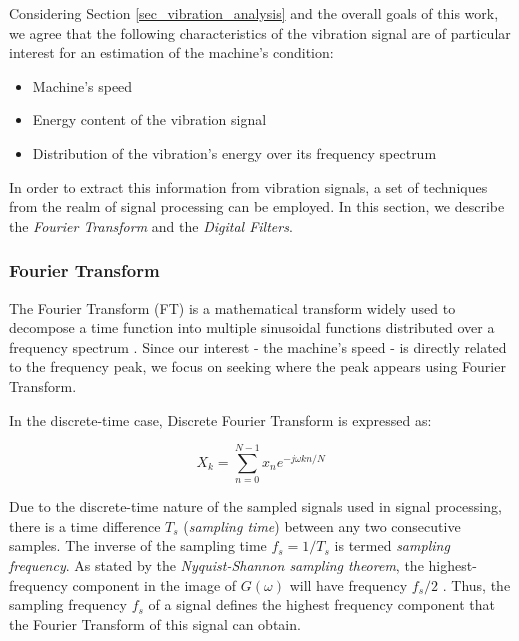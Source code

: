 \documentclass[conference]{IEEEtran}
\begin{document}
Considering Section \ref{sec_vibration_analysis} and the overall goals of this work, we agree that the following characteristics of the vibration signal are of particular interest for an estimation of the machine's condition:

\begin{itemize}
	\item Machine's speed
	\item Energy content of the vibration signal
	\item Distribution of the vibration's energy over its frequency spectrum
\end{itemize}


In order to extract this information from vibration signals, a set of techniques from the realm of signal processing can be employed. In this section, we describe the \textit{Fourier Transform} and the \textit{Digital Filters}.

\subsubsection{Fourier Transform}


The Fourier Transform (FT) is a mathematical transform widely used to decompose a time function into multiple sinusoidal functions distributed over a frequency spectrum \cite{b4}. Since our interest - the machine's speed - is directly related to the frequency peak, we focus on seeking where the peak appears using Fourier Transform.

In the discrete-time case, Discrete Fourier Transform is expressed as: 

\begin{equation}
	\label{eq_fourier_disc}
	X_{k} = \sum_{n = 0}^{N-1} x_{n}e^{-j \omega kn/N}
\end{equation}



Due to the discrete-time nature of the sampled signals used in signal processing, there is a time difference $T_{s}$ (\textit{sampling time}) between any two consecutive samples. The inverse of the sampling time $f_{s}=1/T_{s}$ is termed \textit{sampling frequency}. As stated by the \textit{Nyquist-Shannon sampling theorem}, the highest-frequency component in the image of $G(\omega)$ will have frequency $f_{s}/2$ \cite{b5}. Thus, the sampling frequency $f_{s}$ of a signal defines the highest frequency component that the Fourier Transform of this signal can obtain.
\end{document}
